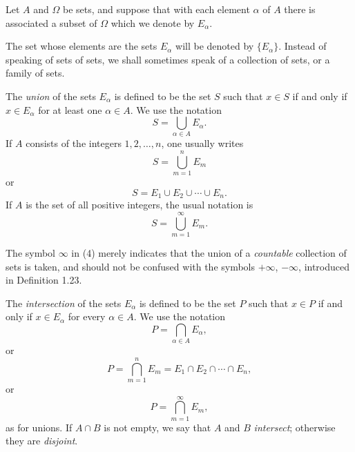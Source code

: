 \documentclass[../poma-notes.tex]{subfiles}
\begin{document}
\begin{definition}
  Let $A$ and $\Omega$ be sets, and suppose that with each element $\alpha$ of $A$ there is associated a subset of
  $\Omega$ which we denote by $E_{\alpha}$.

  The set whose elements are the sets $E_{\alpha}$ will be denoted by $\{E_{\alpha}\}$. Instead of speaking of sets
  of sets, we shall sometimes speak of a collection of sets, or a family of sets.

  The \textit{union} of the sets $E_{\alpha}$ is defined to be the set $S$ such that $x \in S$ if and only if
  $x \in E_{\alpha}$ for at least one $\alpha \in A$. We use the notation
  \begin{equation}
    S = \bigcup \limits_{\alpha\in A} E_{\alpha}.
  \end{equation}
  If $A$ consists of the integers $1,2,\dots,n$, one usually writes
  \begin{equation}
    S = \bigcup \limits_{m=1}^n E_m
  \end{equation}
  or
  \begin{equation}
    S = E_1 \cup E_2 \cup \cdots \cup E_n.
  \end{equation}
  If $A$ is the set of all positive integers, the usual notation is
  \begin{equation}
    S = \bigcup \limits_{m=1}^{\infty} E_m.
  \end{equation}

  The symbol $\infty$ in (4) merely indicates that the union of a \textit{countable} collection of sets is taken,
  and should not be confused with the symbols $+\infty$, $-\infty$, introduced in Definition 1.23.

  The \textit{intersection} of the sets $E_{\alpha}$ is defined to be the set $P$ such that $x \in P$ if and only if
  $x \in E_{\alpha}$ for every $\alpha \in A$. We use the notation
  \begin{equation}
    P = \bigcap \limits_{\alpha \in A} E_{\alpha},
  \end{equation}
  or
  \begin{equation}
    P = \bigcap \limits_{m=1}^n E_m = E_1 \cap E_2 \cap \cdots \cap E_n,
  \end{equation}
  or
  \begin{equation}
    P = \bigcap \limits_{m=1}^{\infty} E_m,
  \end{equation}
  as for unions. If $A \cap B$ is not empty, we say that $A$ and $B$ \textit{intersect}; otherwise they are \textit{disjoint}.
\end{definition}
\end{document}
